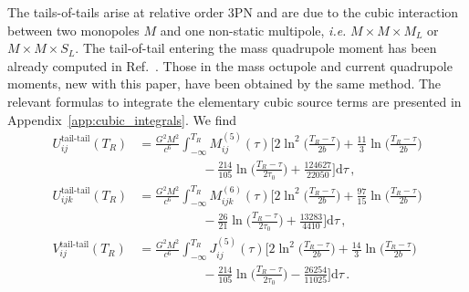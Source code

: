 \documentclass[prd,preprint,superscriptaddress,tightenlines,nofootinbib,
  eqsecnum,showpacs]{revtex4}
\newcommand{\ud}{\mathrm{d}}
\begin{document}
The tails-of-tails arise at relative order 3PN and are due to the
cubic interaction between two monopoles $M$ and one non-static
multipole, \textit{i.e.} $M\times M\times M_L$ or $M\times M\times
S_L$. The tail-of-tail entering the mass quadrupole moment has been
already computed in Ref.~\cite{B98tail}. Those in the mass octupole
and current quadrupole moments, new with this paper, have been
obtained by the same method. The relevant formulas to integrate the
elementary cubic source terms are presented in
Appendix~\ref{app:cubic_integrals}. We find
%
\begin{subequations}\label{tailtail}
\begin{align}
U_{ij}^\text{tail-tail}(T_R) &= \frac{G^2 M^2}{c^6}
\int_{-\infty}^{T_R} M_{ij}^{(5)}(\tau) \bigg[2 \ln^2
  \bigg(\frac{T_R-\tau}{2b} \bigg) + \frac{11}{3} \ln
  \bigg(\frac{T_R-\tau}{2b} \bigg) \nonumber \\ & \qquad\qquad\quad -
  \frac{214}{105}\ln \bigg(\frac{T_R-\tau}{2\tau_0}\bigg) +
  \frac{124627}{22050}\bigg] \ud \tau \,,\label{tailtailU2}\\
U_{ijk}^\text{tail-tail}(T_R) &= \frac{G^2 M^2}{c^6} 
\int_{-\infty}^{T_R} M_{ijk}^{(6)}(\tau) \bigg[2 \ln^2
  \bigg(\frac{T_R-\tau}{2b} \bigg) + \frac{97}{15} \ln
  \bigg(\frac{T_R-\tau}{2b} \bigg) \nonumber \\ & \qquad\qquad\quad -
  \frac{26}{21} \ln \bigg(\frac{T_R-\tau}{2\tau_0}\bigg) +
  \frac{13283}{4410}\bigg] \ud \tau \,,\label{tailtailU3}\\
V_{ij}^\text{tail-tail}(T_R) &= \frac{G^2 M^2}{c^6} 
\int_{-\infty}^{T_R} J_{ij}^{(5)}(\tau) \bigg[2 \ln^2
  \bigg(\frac{T_R-\tau}{2b} \bigg) + \frac{14}{3} \ln
  \bigg(\frac{T_R-\tau}{2b} \bigg) \nonumber \\ & \qquad\qquad\quad -
  \frac{214}{105} \ln \bigg(\frac{T_R-\tau}{2\tau_0}\bigg) -
  \frac{26254}{11025}\bigg] \ud \tau \,.\label{tailtailV2}
\end{align}
\end{subequations}
%
\end{document}
